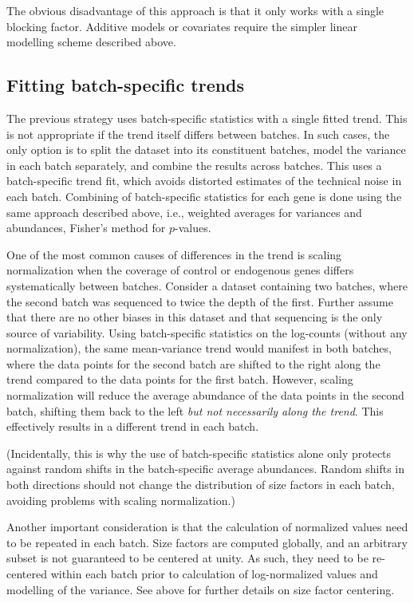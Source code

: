 \documentclass{article}
\begin{document}
The obvious disadvantage of this approach is that it only works with a single blocking factor.
Additive models or covariates require the simpler linear modelling scheme described above.

\subsection{Fitting batch-specific trends}
The previous strategy uses batch-specific statistics with a single fitted trend.
This is not appropriate if the trend itself differs between batches.
In such cases, the only option is to split the dataset into its constituent batches, model the variance in each batch separately, and combine the results across batches.
This uses a batch-specific trend fit, which avoids distorted estimates of the technical noise in each batch.
Combining of batch-specific statistics for each gene is done using the same approach described above, i.e., weighted averages for variances and abundances, Fisher's method for $p$-values.

One of the most common causes of differences in the trend is scaling normalization when the coverage of control or endogenous genes differs systematically between batches.
Consider a dataset containing two batches, where the second batch was sequenced to twice the depth of the first.
Further assume that there are no other biases in this dataset and that sequencing is the only source of variability. 
Using batch-specific statistics on the log-counts (without any normalization), the same mean-variance trend would manifest in both batches,
where the data points for the second batch are shifted to the right along the trend compared to the data points for the first batch.
However, scaling normalization will reduce the average abundance of the data points in the second batch,
shifting them back to the left \textit{but not necessarily along the trend}.
This effectively results in a different trend in each batch.

(Incidentally, this is why the use of batch-specific statistics alone only protects against random shifts in the batch-specific average abundances.
Random shifts in both directions should not change the distribution of size factors in each batch, avoiding problems with scaling normalization.)

Another important consideration is that the calculation of normalized values need to be repeated in each batch.
Size factors are computed globally, and an arbitrary subset is not guaranteed to be centered at unity.
As such, they need to be re-centered within each batch prior to calculation of log-normalized values and modelling of the variance.
See above for further details on size factor centering.
\end{document}
